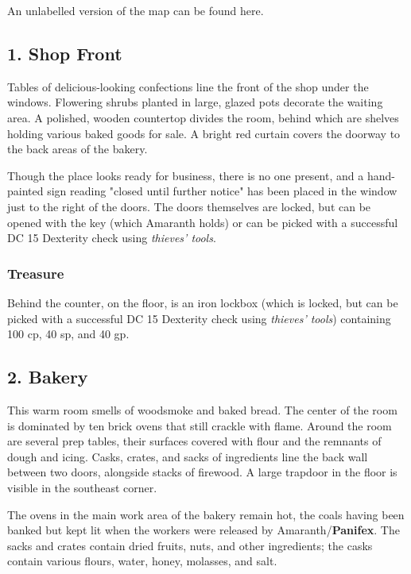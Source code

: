 \documentclass[10pt,a4paper,twoside,bg=print,twocolumn,openany,nodeprecatedcode]{dndbook}
\begin{document}
An unlabelled version of the map can be found here.

\subsection{1. Shop Front}
\begin{DndReadAloud}{}
Tables of delicious-looking confections line the front of the shop under the windows. Flowering shrubs planted in large, glazed pots decorate the waiting area. A polished, wooden countertop divides the room, behind which are shelves holding various baked goods for sale. A bright red curtain covers the doorway to the back areas of the bakery.

\end{DndReadAloud}

Though the place looks ready for business, there is no one present, and a hand-painted sign reading "closed until further notice" has been placed in the window just to the right of the doors. The doors themselves are locked, but can be opened with the key (which Amaranth holds) or can be picked with a successful DC 15 Dexterity check using \textit{thieves' tools}.

\subsubsection{Treasure}
Behind the counter, on the floor, is an iron lockbox (which is locked, but can be picked with a successful DC 15 Dexterity check using \textit{thieves' tools}) containing 100 cp, 40 sp, and 40 gp.

\subsection{2. Bakery}
\begin{DndReadAloud}{}
This warm room smells of woodsmoke and baked bread. The center of the room is dominated by ten brick ovens that still crackle with flame. Around the room are several prep tables, their surfaces covered with flour and the remnants of dough and icing. Casks, crates, and sacks of ingredients line the back wall between two doors, alongside stacks of firewood. A large trapdoor in the floor is visible in the southeast corner.

\end{DndReadAloud}

The ovens in the main work area of the bakery remain hot, the coals having been banked but kept lit when the workers were released by Amaranth/\textbf{Panifex}. The sacks and crates contain dried fruits, nuts, and other ingredients; the casks contain various flours, water, honey, molasses, and salt.
\end{document}
